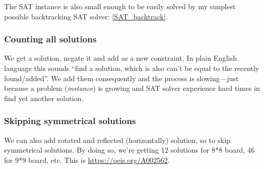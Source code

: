 The SAT instance is also small enough to be easily solved by my simplest possible backtracking SAT solver:
\ref{SAT_backtrack}.

\subsubsection{Counting all solutions}

We get a solution, negate it and add as a new constraint.
In plain English language this sounds ``find a solution, which is also can't be equal to the recently found/added''.
We add them consequently and the process is slowing---just because a problem (\textit{instance}) is growing and SAT solver
experience hard times in find yet another solution.

\subsubsection{Skipping symmetrical solutions}

We can also add rotated and reflected (horizontally) solution, so to skip symmetrical solutions.
By doing so, we're getting 12 solutions for 8*8 board, 46 for 9*9 board, etc.
This is \url{https://oeis.org/A002562}.

